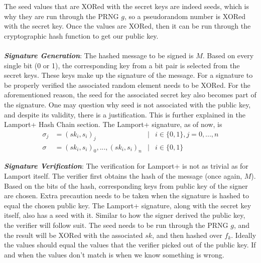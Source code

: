 \documentclass[]{scrartcl}
\makeatletter
\newcommand{\mathleft}{\@fleqntrue\@mathmargin0pt}
\makeatother
\begin{document}
The seed values that are XORed with the secret keys are indeed seeds, which is why they are run through the PRNG $g$, so a pseudorandom number is XORed with the secret key. Once the values are XORed, then it can be run through the cryptographic hash function to get our public key.\\ \\
\textbf{\textit{Signature Generation}}: The hashed message to be signed is $M$. Based on every single bit (0 or 1), the corresponding key from a bit pair is selected from the secret keys. These keys make up the signature of the message. For a signature to be properly verified the associated random element needs to be XORed. For the aforementioned reason, the seed for the associated secret key also becomes part of the signature. One may question why seed is not associated with the public key, and despite its validity, there is a justification. This is further explained in the Lamport+ Hash Chain section. The Lamport+ signature, as of now, is  
\mathleft
\begin{equation}
\begin{split}
\sigma_j & = (sk_i, s_i)_j & | & i \in \{0, 1\}, j = 0,...,n \\
\sigma & = (sk_i, s_i)_0,...,(sk_i, s_i)_n & | & i \in \{0, 1\}
\end{split}
\end{equation}

\textbf{\textit{Signature Verification}}: The verification for Lamport+ is not as trivial as for Lamport itself. The verifier first obtains the hash of the message (once again, $M$). Based on the bits of the hash, corresponding keys from public key of the signer are chosen. Extra precaution needs to be taken when the signature is hashed to equal the chosen public key. The Lamport+ signature, along with the secret key itself, also has a seed with it. Similar to how the signer derived the public key, the verifier will follow suit. The seed needs to be run through the PRNG $g$, and the result will be XORed with the associated $sk$, and then hashed over $f_k$. Ideally the values should equal the values that the verifier picked out of the public key. If and when the values don't match is when we know something is wrong.
\end{document}
